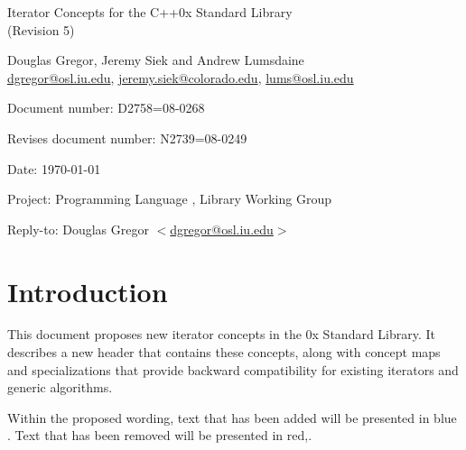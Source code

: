 \documentclass[american,twoside]{book}
\begin{document}
\raggedbottom

\begin{titlepage}
\begin{center}
\huge
Iterator Concepts for the C++0x Standard Library\\
(Revision 5)
\vspace{0.5in}

\normalsize
Douglas Gregor, Jeremy Siek and Andrew Lumsdaine \\
\href{mailto:dgregor@osl.iu.edu}{dgregor@osl.iu.edu}, \href{mailto:jeremy.siek@colorado.edu}{jeremy.siek@colorado.edu}, \href{mailto:lums@osl.iu.edu}{lums@osl.iu.edu}
\end{center}

\vspace{1in}
\par\noindent Document number: D2758=08-0268 \vspace{-6pt}
\par\noindent Revises document number: N2739=08-0249 \vspace{-6pt}
\par\noindent Date: \today\vspace{-6pt}
\par\noindent Project: Programming Language \Cpp{}, Library Working Group\vspace{-6pt}
\par\noindent Reply-to: Douglas Gregor $<$\href{mailto:dgregor@osl.iu.edu}{dgregor@osl.iu.edu}$>$\vspace{-6pt}

\section*{Introduction}
This document proposes new iterator concepts in the \Cpp0x Standard
Library. It describes a new header  that
contains these concepts, along with concept maps and
 specializations that provide backward
compatibility for existing iterators and generic algorithms.

Within the proposed wording, text that has been added
\textcolor{addclr}{will be presented in blue} . Text that has been removed will be
presented \textcolor{remclr}{in red},. 



\end{titlepage}
\end{document}
